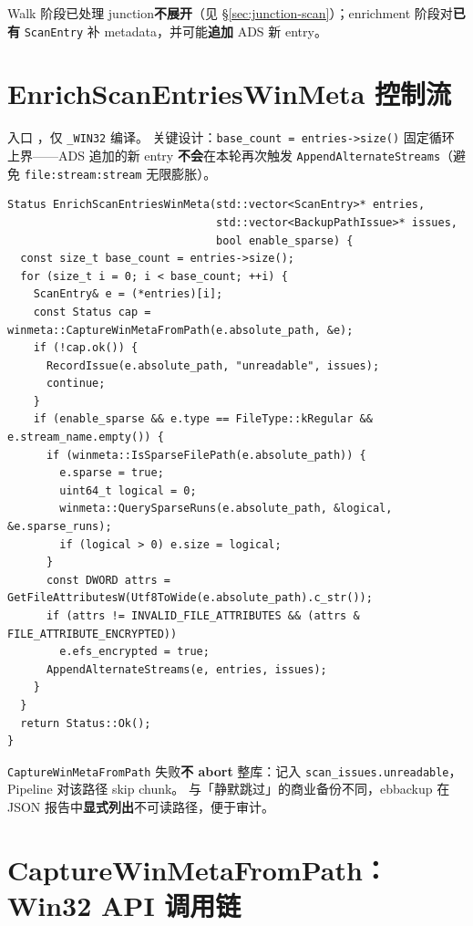 Walk 阶段已处理 junction\textbf{不展开}（见 §\ref{sec:junction-scan}）；enrichment 阶段对\textbf{已有} \texttt{ScanEntry} 补 metadata，并可能\textbf{追加} ADS 新 entry。

\section{EnrichScanEntriesWinMeta 控制流}

入口 ，仅 \texttt{\_WIN32} 编译。
关键设计：\texttt{base\_count = entries->size()} 固定循环上界——ADS 追加的新 entry \textbf{不会}在本轮再次触发 \texttt{AppendAlternateStreams}（避免 \texttt{file:stream:stream} 无限膨胀）。

\begin{lstlisting}[caption={Enrich 主循环 (scan\_entry.cc)}]
Status EnrichScanEntriesWinMeta(std::vector<ScanEntry>* entries,
                                std::vector<BackupPathIssue>* issues,
                                bool enable_sparse) {
  const size_t base_count = entries->size();
  for (size_t i = 0; i < base_count; ++i) {
    ScanEntry& e = (*entries)[i];
    const Status cap = winmeta::CaptureWinMetaFromPath(e.absolute_path, &e);
    if (!cap.ok()) {
      RecordIssue(e.absolute_path, "unreadable", issues);
      continue;
    }
    if (enable_sparse && e.type == FileType::kRegular && e.stream_name.empty()) {
      if (winmeta::IsSparseFilePath(e.absolute_path)) {
        e.sparse = true;
        uint64_t logical = 0;
        winmeta::QuerySparseRuns(e.absolute_path, &logical, &e.sparse_runs);
        if (logical > 0) e.size = logical;
      }
      const DWORD attrs = GetFileAttributesW(Utf8ToWide(e.absolute_path).c_str());
      if (attrs != INVALID_FILE_ATTRIBUTES && (attrs & FILE_ATTRIBUTE_ENCRYPTED))
        e.efs_encrypted = true;
      AppendAlternateStreams(e, entries, issues);
    }
  }
  return Status::Ok();
}
\end{lstlisting}

\begin{designbox}
\texttt{CaptureWinMetaFromPath} 失败\textbf{不 abort} 整库：记入 \texttt{scan\_issues.unreadable}，Pipeline 对该路径 skip chunk。
与「静默跳过」的商业备份不同，ebbackup 在 JSON 报告中\textbf{显式列出}不可读路径，便于审计。
\end{designbox}

\section{CaptureWinMetaFromPath：Win32 API 调用链}

